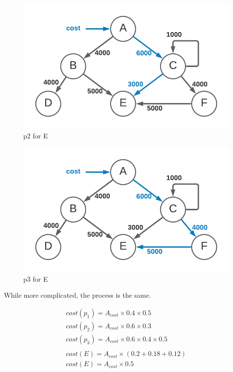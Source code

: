 \documentclass[10pt, a4paper, twocolumn]{article}
\begin{document}
      \begin{figure}[H]
        \centering
        \includegraphics[width=\linewidth]{./truth-and-reconciliation-cost-ep2.png}
        \caption{p2 for E}
        \label{figure:6}
      \end{figure}

      \begin{figure}[H]
        \centering
        \includegraphics[width=\linewidth]{./truth-and-reconciliation-cost-ep3.png}
        \caption{p3 for E}
        \label{figure:7}
      \end{figure}

      While more complicated, the process is the same.

      \begin{gather*}
        cost(p_{1}) = A_{cost} \times 0.4 \times 0.5 \\
        cost(p_{2}) = A_{cost} \times 0.6 \times 0.3 \\
        cost(p_{3}) = A_{cost} \times 0.6 \times 0.4 \times 0.5 \\
        \\
        cost(E) = A_{cost} \times (0.2 + 0.18 + 0.12) \\
        cost(E) = A_{cost} \times 0.5 \\
      \end{gather*}
\end{document}
